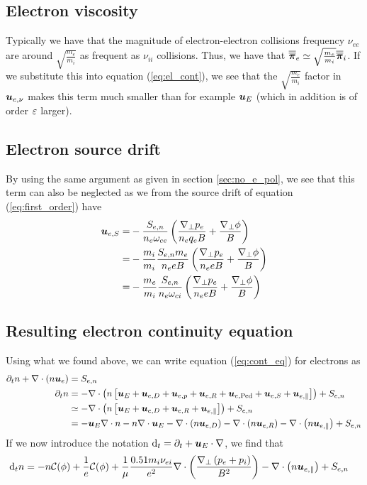 \subsection{Electron viscosity}
%
Typically we have that the magnitude of electron-electron collisions frequency $\nu_{ee}$ are around $\sqrt{\frac{m_e}{m_i}}$ as frequent as $\nu_{ii}$ collisions.
Thus, we have that $\boldsymbol{\overline{\overline{\pi}}}_e \simeq \sqrt{\frac{m_e}{m_i}}\boldsymbol{\overline{\overline{\pi}}}_i$.
If we substitute this into equation (\ref{eq:el_cont}), we see that the $\sqrt{\frac{m_e}{m_i}}$ factor in $\boldsymbol{u}_{e, \nu}$ makes this term much smaller than for example $\boldsymbol{u}_E$ (which in addition is of order $\varepsilon$ larger).

\subsection{Electron source drift}
\label{sec:no_e_source}
%
By using the same argument as given in section \ref{sec:no_e_pol}, we see that this term can also be neglected as we from the source drift of equation (\ref{eq:first_order}) have
%
\begin{align*}
    \ve{u}_{e,S}
    =&
  - \frac{ S_{e,n}}{n_e \om_{ce}}
  \L( \frac{\grad_\perp p_e}{n_e q_e B}
  + \frac{\grad_\perp \phi}{B} \R)
  \\
%
  =&
  - \frac{m_i}{m_i}
  \frac{ S_{e,n} m_e}{n_e e B} \L(
   \frac{\grad_\perp p_e}{n_e e B}
  + \frac{\grad_\perp \phi}{B} \R)
  \\
%
  =&
  - \frac{m_e}{m_i} \frac{ S_{e,n}}{n_e \om_{ci}} \L(
  \frac{\grad_\perp p_e}{n_e e B}
  + \frac{\grad_\perp \phi}{B}
  \R)
\end{align*}

\subsection{Resulting electron continuity equation}
%
Using what we found above, we can write equation (\ref{eq:cont_eq}) for electrons as
%
\begin{align*}
    \partial_t n + \div\L(n\ve{u}_e\R)
    &= S_{e,n}
    \\
%
    \partial_t n
    &=
    - \div\L(n\L[ \ve{u}_E
    + \ve{u}_{e,D}
    + \ve{u}_{e,p}
    + \ve{u}_{e,R}
    + \ve{u}_{e,\text{Ped}}
    + \ve{u}_{e,S}
    + \ve{u}_{e,\|} \R]\R)
    + S_{e,n}
    \\
%
    &\simeq
    - \div\L(n\L[\ve{u}_E + \ve{u}_{e,D} + \ve{u}_{e,R} + \ve{u}_{e,\|}\R]\R)
    + S_{e,n}
    \\
%
    &=
    - \ve{u}_E\nabla\cdot n
    - n\div\ve{u}_E
    - \div\L(n \ve{u}_{e,D}\R)
    - \div\L(n \ve{u}_{e,R}\R)
    - \div\L(n \ve{u}_{e,\|}\R)
    + S_{e,n}
\end{align*}
%
If we now introduce the notation $\text{d}_t = \partial_t + \boldsymbol{u}_E\cdot\nabla$, we find that
%
\begin{align}
    \text{d}_t n
    &=
    - n\mathcal{C}(\phi)
    + \frac{1}{e}\mathcal{C}(\phi)
    +\frac{1}{\mu}\frac{0.51m_i\nu_{ei}}{e^2}
    \nabla\cdot\left( \frac{\nabla_\perp \left(p_e + p_i\right)}{B^2} \right)
    - \nabla\cdot\left(n \boldsymbol{u}_{e,\|}\right)
    + S_{e,n}
    \label{eq:dens_evol_gen}
\end{align}

